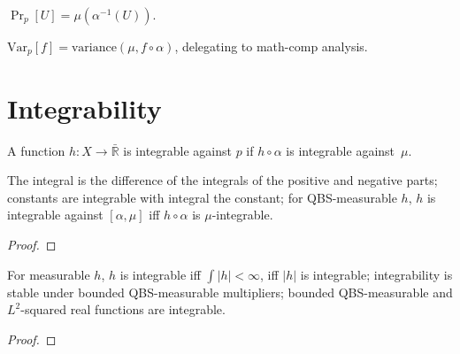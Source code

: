 \begin{definition}\label{def:qbs_event}
  \rocqok
  $\Pr_p[U] = \mu(\alpha^{-1}(U))$.
\end{definition}

\begin{definition}\label{def:qbs_variance}
  \rocqok
  $\mathrm{Var}_p[f] = \mathrm{variance}(\mu, f \circ \alpha)$,
  delegating to math-comp analysis.
\end{definition}


\section{Integrability}\label{sec:integrability}

\begin{definition}\label{def:qbs_integrable}
  \rocqok
  A function $h : X \to \bar{\mathbb{R}}$ is integrable against $p$
  if $h \circ \alpha$ is integrable against~$\mu$.
\end{definition}

\begin{lemma}\label{lem:qbs_integral_basics}
  \rocqok
  The integral is the difference of the integrals of the positive and negative parts; constants are integrable with integral the constant; for QBS-measurable $h$, $h$ is integrable against $[\alpha, \mu]$ iff $h \circ \alpha$ is $\mu$-integrable.
\end{lemma}
\begin{proof}\rocqok\end{proof}

\begin{lemma}\label{lem:qbs_integrableP}
  \rocqok
  For measurable $h$, $h$ is integrable iff $\int |h| < \infty$, iff $|h|$ is integrable; integrability is stable under bounded QBS-measurable multipliers; bounded QBS-measurable and $L^2$-squared real functions are integrable.
\end{lemma}
\begin{proof}\rocqok\end{proof}

